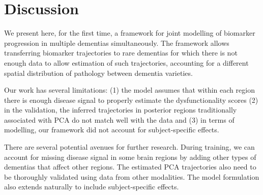 \documentclass{llncs}
\begin{document}
\section{Discussion}

We present here, for the first time, a framework for joint modelling of biomarker progression in multiple dementias simultaneously. The framework allows transferring biomarker trajectories to rare dementias for which there is not enough data to allow estimation of such trajectories, accounting for a different spatial distribution of pathology between dementia varieties. 

Our work has several limitations: (1) the model assumes that within each region there is enough disease signal to properly estimate the dysfunctionality scores (2) in the validation, the inferred trajectories in posterior regions traditionally associated with PCA do not match well with the data and (3) in terms of modelling, our framework did not account for subject-specific effects.

There are several potential avenues for further research. During training, we can account for missing disease signal in some brain regions by adding other types of dementias that affect other regions. The estimated PCA trajectories also need to be thoroughly validated using data from other modalities. The model formulation also extends naturally to include subject-specific effects.

%
\end{document}
